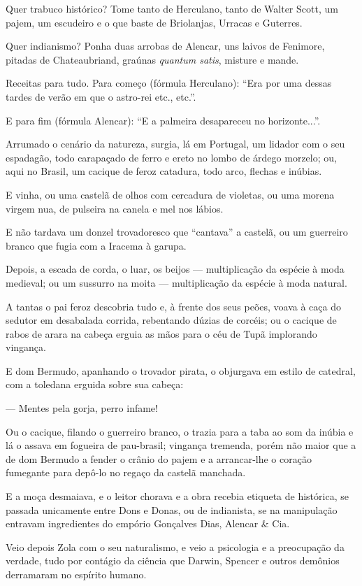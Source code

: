 Quer trabuco histórico? Tome tanto de Herculano, tanto de Walter Scott,
um pajem, um escudeiro e o que baste de Briolanjas, Urracas e Guterres.

Quer indianismo? Ponha duas arrobas de Alencar, uns laivos de Fenimore,
pitadas de Chateaubriand, graúnas \emph{quantum satis}, misture e mande.

Receitas para tudo. Para começo (fórmula Herculano): ``Era por uma
dessas tardes de verão em que o astro-rei etc., etc.''.

E para fim (fórmula Alencar): ``E a palmeira desapareceu no
horizonte...''.

Arrumado o cenário da natureza, surgia, lá em Portugal, um lidador com o
seu espadagão, todo carapaçado de ferro e ereto no lombo de árdego
morzelo; ou, aqui no Brasil, um cacique de feroz catadura, todo arco,
flechas e inúbias.

E vinha, ou uma castelã de olhos com cercadura de violetas, ou uma
morena virgem nua, de pulseira na canela e mel nos lábios.

E não tardava um donzel trovadoresco que ``cantava'' a castelã, ou um
guerreiro branco que fugia com a Iracema à garupa.

Depois, a escada de corda, o luar, os beijos --- multiplicação da
espécie à moda medieval; ou um sussurro na moita --- multiplicação da
espécie à moda natural.

A tantas o pai feroz descobria tudo e, à frente dos seus peões, voava à
caça do sedutor em desabalada corrida, rebentando dúzias de corcéis; ou
o cacique de rabos de arara na cabeça erguia as mãos para o céu de Tupã
implorando vingança.

E dom Bermudo, apanhando o trovador pirata, o objurgava em estilo de
catedral, com a toledana erguida sobre sua cabeça:

--- Mentes pela gorja, perro infame!

Ou o cacique, filando o guerreiro branco, o trazia para a taba ao som da
inúbia e lá o assava em fogueira de pau-brasil; vingança tremenda, porém
não maior que a de dom Bermudo a fender o crânio do pajem e a
arrancar-lhe o coração fumegante para depô-lo no regaço da castelã
manchada.

E a moça desmaiava, e o leitor chorava e a obra recebia etiqueta de
histórica, se passada unicamente entre Dons e Donas, ou de indianista,
se na manipulação entravam ingredientes do empório Gonçalves Dias,
Alencar \& Cia.

Veio depois Zola com o seu naturalismo, e veio a psicologia e a
preocupação da verdade, tudo por contágio da ciência que Darwin, Spencer
e outros demônios derramaram no espírito humano.

